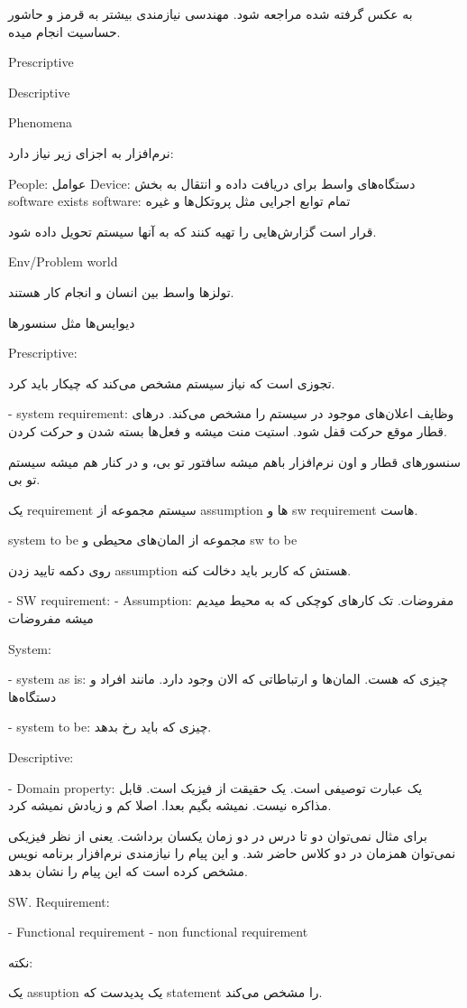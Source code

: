 به عکس گرفته شده مراجعه شود. مهندسی نیازمندی بیشتر به قرمز و حاشور حساسیت انجام
میده.

Prescriptive

Descriptive

Phenomena

نرم‌افزار به اجزای زیر نیاز دارد:

People: عوامل
Device: دستگاه‌های واسط برای دریافت داده و انتقال به بخش software
exists software: تمام توابع اجرایی مثل پروتکل‌ها و غیره

قرار است گزارش‌هایی را تهیه کنند که به آنها سیستم تحویل داده شود.

Env/Problem world

تولز‌ها واسط بین انسان و انجام کار هستند.

دیوایس‌ها مثل سنسور‌ها

Prescriptive:

تجوزی است که نیاز سیستم مشخص می‌کند که چیکار باید کرد.

- system requirement: وظایف اعلان‌های موجود در سیستم را مشخص می‌کند.  در‌های
قطار موقع حرکت قفل شود. استیت منت میشه و فعل‌ها بسته شدن و حرکت کردن.

سنسور‌های قطار و اون نرم‌افزار باهم میشه سافتور تو بی، و در کنار هم میشه سیستم
تو بی.

یک requirement سیستم مجموعه‌ از assumption ها و sw requirement هاست.

system to be مجموعه از المان‌های‌ محیطی و sw to be

روی دکمه تایید زدن assumption هستش که کاربر باید دخالت کنه.

- SW requirement: 
- Assumption: مفروضات. تک کار‌های کوچکی که به محیط میدیم میشه مفروضات

System:

- system as is: چیزی که هست. المان‌ها و ارتباطاتی که الان وجود دارد.
مانند افراد و دستگاه‌ها

- system to be: چیزی که باید رخ بدهد.

Descriptive:

- Domain property: یک عبارت توصیفی است. یک حقیقت از فیزیک است. قابل مذاکره نیست.
نمیشه بگیم بعدا. اصلا کم و زیادش نمیشه کرد.

برای مثال نمی‌توان دو تا درس در دو زمان یکسان برداشت. یعنی از نظر فیزیکی
نمی‌توان همزمان در دو کلاس حاضر شد. و این پیام را نیازمندی نرم‌افزار برنامه نویس
مشخص کرده است که این پیام را نشان بدهد.

SW. Requirement:

- Functional requirement
- non functional requirement

نکته:

یک assuption یک پدیدست که statement را مشخص می‌کند.